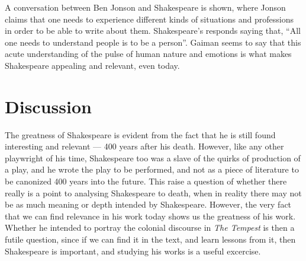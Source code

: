 \documentclass{article}
\begin{document}
A conversation between Ben Jonson and Shakespeare is shown, where Jonson claims that one needs to experience different kinds of situations and professions in order to be able to write about them. Shakespeare's responds saying that, ``All one needs to understand people is to be a person''. Gaiman seems to say that this acute understanding of the pulse of human nature and emotions is what makes Shakespeare appealing and relevant, even today. 

\section{Discussion}
The greatness of Shakespeare is evident from the fact that he is still found interesting and relevant --- 400 years after his death. However, like any other playwright of his time, Shakespeare too was a slave of the quirks of production of a play, and he wrote the play to be performed, and not as a piece of literature to be canonized 400 years into the future. This raise a question of whether there really is a point to analysing Shakespeare to death, when in reality there may not be as much meaning or depth intended by Shakespeare. However, the very fact that we can find relevance in his work today shows us the greatness of his work. Whether he intended to portray the colonial discourse in \emph{The Tempest} is then a futile question, since if we can find it in the text, and learn lessons from it, then Shakespeare is important, and studying his works is a useful excercise. 

  \footnotesize{
    
    
  }
\end{document}
